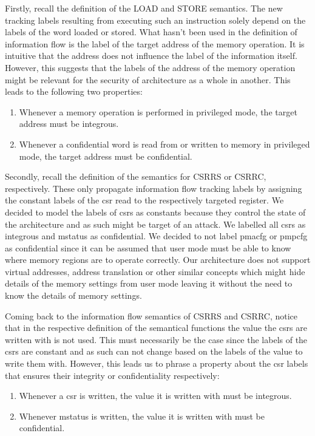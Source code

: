 Firstly, recall the definition of the LOAD and STORE semantics.
The new tracking labels resulting from executing such an instruction solely depend on the labels of the word loaded or stored.
What hasn't been used in the definition of information flow is the label of the target address of the memory operation.
It is intuitive that the address does not influence the label of the information itself.
However, this suggests that the labels of the address of the memory operation might be relevant for the security of architecture as a whole in another.
This leads to the following two properties:
\begin{enumerate}[label=\Roman*.,series=]
    \item \label{itm:prop-mem-i}
    Whenever a memory operation is performed in privileged mode, the target address must be integrous.
    \item \label{itm:prop-mem-c}
    Whenever a confidential word is read from or written to memory in privileged mode, the target address must be confidential.
\end{enumerate}


Secondly, recall the definition of the semantics for CSRRS or CSRRC, respectively.
These only propagate information flow tracking labels by assigning the constant labels of the \gls{csr} read to the respectively targeted register.
We decided to model the labels of \glspl{csr} as constants because they control the state of the architecture and as such might be target of an attack.
We labelled all \glspl{csr} as integrous and \gls{mstatus} as confidential.
We decided to not label \gls{pmacfg} or \gls{pmpcfg} as confidential since it can be assumed that user mode must be able to know where memory regions are to operate correctly.
Our architecture does not support virtual addresses, address translation or other similar concepts which might hide details of the memory settings from user mode leaving it without the need to know the details of memory settings.

Coming back to the information flow semantics of CSRRS and CSRRC, notice that in the respective definition of the semantical functions the value the \glspl{csr} are written with is not used.
This must necessarily be the case since the labels of the \glspl{csr} are constant and as such can not change based on the labels of the value to write them with.
However, this leads us to phrase a property about the \gls{csr} labels that ensures their integrity or confidentiality respectively:
\begin{enumerate}[label=\Roman*.,resume]
    \item \label{itm:prop-csr-i}
    Whenever a \gls{csr} is written, the value it is written with must be integrous.
    \item \label{itm:prop-mstatus-c}
    Whenever \gls{mstatus} is written, the value it is written with must be confidential.
\end{enumerate}

